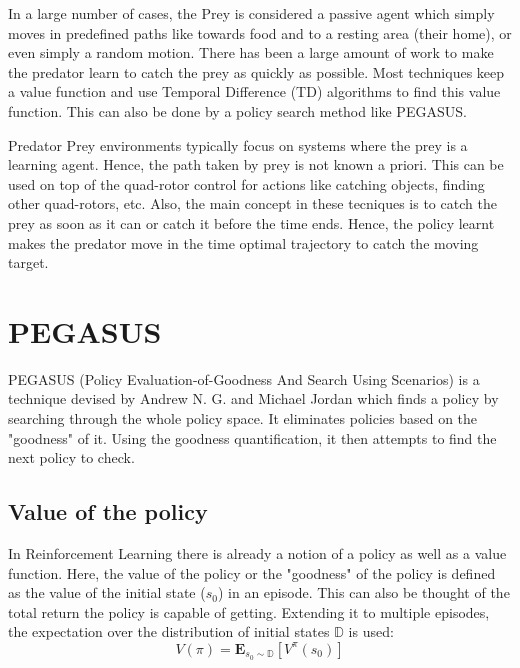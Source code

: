 \documentclass[hidelinks,BTech]{iitmdiss}
\begin{document}
In a large number of cases, the Prey is considered a passive agent which simply moves in predefined paths like towards food and to a resting area (their home), or even simply a random motion. There has been a large amount of work to make the predator learn to catch the prey as quickly as possible. Most techniques \cite{PredatorPrey} keep a value function and use Temporal Difference (TD) algorithms to find this value function. This can also be done by a policy search method like PEGASUS.

Predator Prey environments typically focus on systems where the prey is a learning agent. Hence, the path taken by prey is not known a priori. This can be used on top of the quad-rotor control for actions like catching objects, finding other quad-rotors, etc. Also, the main concept in these tecniques is to catch the prey as soon as it can or catch it before the time ends. Hence, the policy learnt makes the predator move in the time optimal trajectory to catch the moving target.


\chapter{PEGASUS}

PEGASUS \cite{PEGASUS} (Policy Evaluation-of-Goodness And Search Using Scenarios) is a technique devised by Andrew N. G. and Michael Jordan which finds a policy by searching through the whole policy space. It eliminates policies based on the "goodness" of it. Using the goodness quantification, it then attempts to find the next policy to check.

\section{Value of the policy}

In Reinforcement Learning there is already a notion of a policy as well as a value function. Here, the value of the policy or the "goodness" of the policy is defined as the value of the initial state ($s_{0}$) in an episode. This can also be thought of the total return the policy is capable of getting. Extending it to multiple episodes, the expectation over the distribution of initial states $\mathbb{D}$ is used:
\begin{equation}
  V(\pi) = \mathbf{E}_{s_{0} \sim \mathbb{D}} [ V^{\pi} (s_{0})]
\end{equation}
\end{document}
